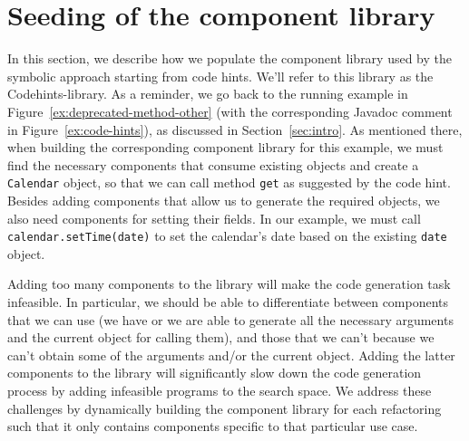 \documentclass[sigconf,review,anonymous]{acmart}
\begin{document}
  


\section{Seeding of the component library} \label{sec:components-seeding}

In this section, we describe how we populate the component library used by the symbolic approach starting from code hints. We'll refer to this library as the Codehints-library.
%
As a reminder, we go back to the running example in Figure~\ref{ex:deprecated-method-other} (with the corresponding Javadoc comment in Figure~\ref{ex:code-hints}), as
discussed in Section~\ref{sec:intro}.
As mentioned there, when building the corresponding component library for this example, 
%
we must find the necessary
components that consume existing objects and create a \texttt{Calendar} object, so that we can call method \texttt{get} as suggested by the code hint.
Besides adding components that allow us to generate the required objects, we also need components for setting their
fields. In our example, we must call
\texttt{calendar.setTime(date)} to set the calendar's date
based on the existing \texttt{date} object.

Adding too many components to the library will
make the code generation task infeasible. In particular, we should
be able to differentiate between components that we can use
(we have or we are able to generate
all the necessary arguments and the current object for calling them), and those
that we can't because we can't obtain some of the arguments
and/or the current object. Adding the latter components to the library will
significantly slow down the code generation process by
adding infeasible programs to the search space.
We address these challenges by dynamically building the component library for each refactoring
such that it only contains components specific to that particular use case.
\end{document}
